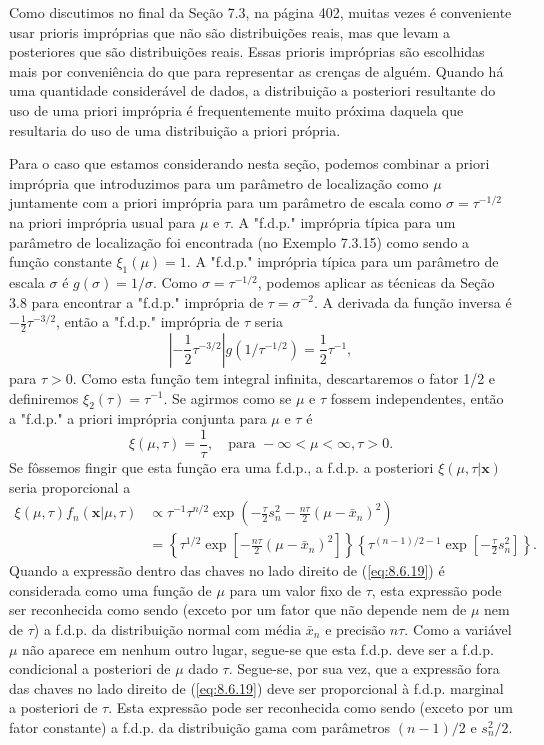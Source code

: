 Como discutimos no final da Seção 7.3, na página 402, muitas vezes é conveniente usar prioris impróprias que não são distribuições reais, mas que levam a posteriores que são distribuições reais. Essas prioris impróprias são escolhidas mais por conveniência do que para representar as crenças de alguém. Quando há uma quantidade considerável de dados, a distribuição a posteriori resultante do uso de uma priori imprópria é frequentemente muito próxima daquela que resultaria do uso de uma distribuição a priori própria.

Para o caso que estamos considerando nesta seção, podemos combinar a priori imprópria que introduzimos para um parâmetro de localização como $\mu$ juntamente com a priori imprópria para um parâmetro de escala como $\sigma = \tau^{-1/2}$ na priori imprópria usual para $\mu$ e $\tau$. A "f.d.p." imprópria típica para um parâmetro de localização foi encontrada (no Exemplo 7.3.15) como sendo a função constante $\xi_1(\mu) = 1$. A "f.d.p." imprópria típica para um parâmetro de escala $\sigma$ é $g(\sigma) = 1/\sigma$. Como $\sigma = \tau^{-1/2}$, podemos aplicar as técnicas da Seção 3.8 para encontrar a "f.d.p." imprópria de $\tau = \sigma^{-2}$. A derivada da função inversa é $-\frac{1}{2}\tau^{-3/2}$, então a "f.d.p." imprópria de $\tau$ seria
\[
\left|-\frac{1}{2}\tau^{-3/2}\right| g(1/\tau^{-1/2}) = \frac{1}{2}\tau^{-1},
\]
para $\tau > 0$. Como esta função tem integral infinita, descartaremos o fator 1/2 e definiremos $\xi_2(\tau) = \tau^{-1}$. Se agirmos como se $\mu$ e $\tau$ fossem independentes, então a "f.d.p." a priori imprópria conjunta para $\mu$ e $\tau$ é
\[
\xi(\mu, \tau) = \frac{1}{\tau}, \quad \text{para } -\infty < \mu < \infty, \tau > 0.
\]
Se fôssemos fingir que esta função era uma f.d.p., a f.d.p. a posteriori $\xi(\mu, \tau|\mathbf{x})$ seria proporcional a
\begin{align} \label{eq:8.6.19}
    \xi(\mu, \tau) f_n(\mathbf{x}|\mu, \tau) &\propto \tau^{-1}\tau^{n/2} \exp\left(-\frac{\tau}{2}s_n^2 - \frac{n\tau}{2}(\mu - \bar{x}_n)^2\right) \\
    &= \left\{\tau^{1/2}\exp\left[-\frac{n\tau}{2}(\mu - \bar{x}_n)^2\right]\right\} \left\{\tau^{(n-1)/2 - 1} \exp\left[-\frac{\tau}{2}s_n^2\right]\right\}. \nonumber
\end{align}
Quando a expressão dentro das chaves no lado direito de (\ref{eq:8.6.19}) é considerada como uma função de $\mu$ para um valor fixo de $\tau$, esta expressão pode ser reconhecida como sendo (exceto por um fator que não depende nem de $\mu$ nem de $\tau$) a f.d.p. da distribuição normal com média $\bar{x}_n$ e precisão $n\tau$. Como a variável $\mu$ não aparece em nenhum outro lugar, segue-se que esta f.d.p. deve ser a f.d.p. condicional a posteriori de $\mu$ dado $\tau$. Segue-se, por sua vez, que a expressão fora das chaves no lado direito de (\ref{eq:8.6.19}) deve ser proporcional à f.d.p. marginal a posteriori de $\tau$. Esta expressão pode ser reconhecida como sendo (exceto por um fator constante) a f.d.p. da distribuição gama com parâmetros $(n-1)/2$ e $s_n^2/2$.

